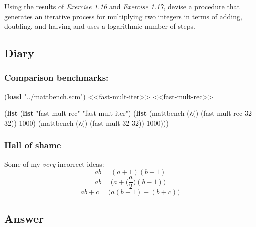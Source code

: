 \documentclass[
]{article}
\newenvironment{Shaded}{}{}
\newcommand{\DecValTok}[1]{\textcolor[rgb]{0.25,0.63,0.44}{#1}}
\newcommand{\KeywordTok}[1]{\textcolor[rgb]{0.00,0.44,0.13}{\textbf{#1}}}
\newcommand{\NormalTok}[1]{#1}
\newcommand{\StringTok}[1]{\textcolor[rgb]{0.25,0.44,0.63}{#1}}
\begin{document}
Using the results of {\emph{Exercise 1.16}} and {\emph{Exercise 1.17}},
devise a procedure that generates an iterative process for multiplying
two integers in terms of adding, doubling, and halving and uses a
logarithmic number of steps.

\hypertarget{diary-3}{%
\subsection{Diary}\label{diary-3}}

\hypertarget{comparison-benchmarks}{%
\subsubsection{Comparison benchmarks:}\label{comparison-benchmarks}}

\begin{Shaded}
\begin{Highlighting}[numbers=left,,]
\NormalTok{(}\KeywordTok{load} \StringTok{"../mattbench.scm"}\NormalTok{)}
\NormalTok{\textless{}\textless{}fast{-}mult{-}iter\textgreater{}\textgreater{}}
\NormalTok{\textless{}\textless{}fast{-}mult{-}rec\textgreater{}\textgreater{}}

\NormalTok{(}\KeywordTok{list}\NormalTok{ (}\KeywordTok{list} \StringTok{"fast{-}mult{-}rec"} \StringTok{"fast{-}mult{-}iter"}\NormalTok{)}
\NormalTok{      (}\KeywordTok{list}\NormalTok{ (mattbench (λ() (fast{-}mult{-}rec }\DecValTok{32} \DecValTok{32}\NormalTok{)) }\DecValTok{1000}\NormalTok{)}
\NormalTok{            (mattbench (λ() (fast{-}mult }\DecValTok{32} \DecValTok{32}\NormalTok{)) }\DecValTok{1000}\NormalTok{)))}
\end{Highlighting}
\end{Shaded}

\hypertarget{hall-of-shame}{%
\subsubsection{Hall of shame}\label{hall-of-shame}}

Some of my \emph{very} incorrect ideas: \[ab = (a+1)(b-1)\]
\[ab = \big(a+\Big(\frac{a}{2}\Big)(b-1)\big)\]
\[ab+c = \big(a(b-1)+(b+c)\big)\]

\hypertarget{answer-16}{%
\subsection{Answer}\label{answer-16}}
\end{document}
